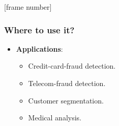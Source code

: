 \documentclass[aspectratio=169,t,xcolor=dvipsnames]{beamer}
\begin{document}
{
  [frame number]
  \begin{frame}
    \frametitle{Where to use it?}
    \begin{itemize}
      \item \textbf{Applications}:
            \begin{itemize}
              \item Credit-card-fraud detection.
              \item Telecom-fraud detection.
              \item Customer segmentation.
              \item Medical analysis.
            \end{itemize}
    \end{itemize}
  \end{frame}
}
\end{document}
